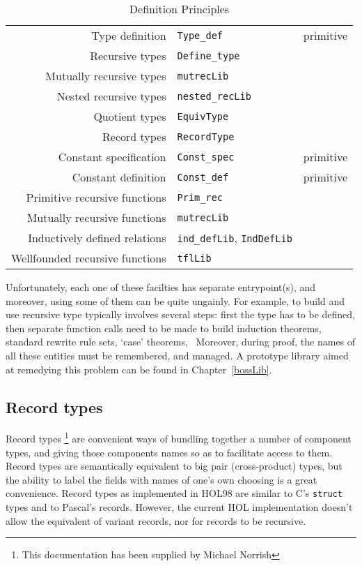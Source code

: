 \documentclass[12pt,fleqn,a4paper]{report}
\begin{document}
\begin{table}[ht]
\begin{center}
\begin{tabular}{|r|l|r|} \hline
Type definition & \verb+Type_def+ & primitive \\
Recursive types & \verb+Define_type+ &  \\
Mutually recursive types & \verb+mutrecLib+ & \\
Nested recursive types & \verb+nested_recLib+ & \\
Quotient types & \verb+EquivType+ & \\
Record types & \verb+RecordType+ & \\\hline
Constant specification & \verb+Const_spec+ & primitive \\
Constant definition & \verb+Const_def+ & primitive \\
Primitive recursive functions & \verb+Prim_rec+ & \\
Mutually recursive functions & \verb+mutrecLib+ & \\
Inductively defined relations & \verb+ind_defLib+,  \verb+IndDefLib+ & \\
Wellfounded recursive functions & \verb+tflLib+ & \\
 \hline
\end{tabular}
\caption{Definition Principles}\label{PoD}
\end{center}\end{table}

Unfortunately, each one of these facilties has separate entrypoint(s),
and moreover, using some of them can be quite ungainly. For example, to
build and use recursive type typically involves several steps: first the
type has to be defined, then separate function calls need to be made to
build induction theorems, standard rewrite rule sets, `case' theorems,
\etc\ Moreover, during proof, the names of all these entities must be
remembered, and managed. A prototype library aimed at remedying this
problem can be found in Chapter~\ref{bossLib}.

\subsection{Record types}

Record types \footnote{This documentation has been supplied by Michael
Norrish} are convenient ways of bundling together a number of component
types, and giving those components names so as to facilitate access to
them.  Record types are semantically equivalent to big pair
(cross-product) types, but the ability to label the fields with names of
one's own choosing is a great convenience.  Record types as implemented
in HOL98 are similar to C's {\tt struct} types and to Pascal's records.
However, the current HOL implementation doesn't allow the equivalent of
variant records, nor for records to be recursive.
\end{document}
